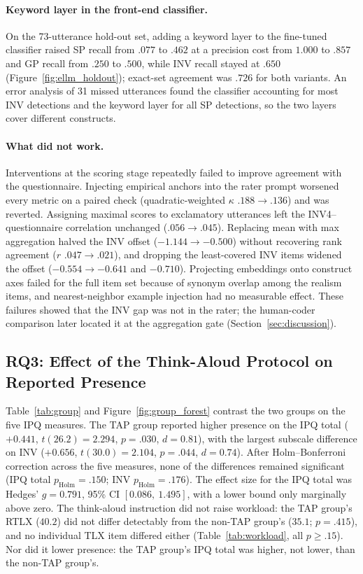 \paragraph{Keyword layer in the front-end classifier.}
On the 73-utterance hold-out set, adding a keyword layer to the fine-tuned classifier raised SP recall from $.077$ to $.462$ at a precision cost from $1.000$ to $.857$ and GP recall from $.250$ to $.500$, while INV recall stayed at $.650$ (Figure~\ref{fig:ellm_holdout}); exact-set agreement was $.726$ for both variants. An error analysis of 31 missed utterances found the classifier accounting for most INV detections and the keyword layer for all SP detections, so the two layers cover different constructs.

\paragraph{What did not work.}
Interventions at the scoring stage repeatedly failed to improve agreement with the questionnaire. Injecting empirical anchors into the rater prompt worsened every metric on a paired check (quadratic-weighted $\kappa$ $.188\rightarrow.136$) and was reverted. Assigning maximal scores to exclamatory utterances left the INV4--questionnaire correlation unchanged ($.056\rightarrow.045$). Replacing mean with max aggregation halved the INV offset ($-1.144\rightarrow-0.500$) without recovering rank agreement ($r$ $.047\rightarrow.021$), and dropping the least-covered INV items widened the offset ($-0.554\rightarrow-0.641$ and $-0.710$). Projecting embeddings onto construct axes failed for the full item set because of synonym overlap among the realism items, and nearest-neighbor example injection had no measurable effect. These failures showed that the INV gap was not in the rater; the human-coder comparison later located it at the aggregation gate (Section~\ref{sec:discussion}).


\subsection{RQ3: Effect of the Think-Aloud Protocol on Reported Presence}
\label{subsec:rq3}

Table~\ref{tab:group} and Figure~\ref{fig:group_forest} contrast the two groups on the five IPQ measures. The TAP group reported higher presence on the IPQ total ($+0.441$, $t(26.2)=2.294$, $p=.030$, $d=0.81$), with the largest subscale difference on INV ($+0.656$, $t(30.0)=2.104$, $p=.044$, $d=0.74$). After Holm--Bonferroni correction across the five measures, none of the differences remained significant (IPQ total $p_{\mathrm{Holm}}=.150$; INV $p_{\mathrm{Holm}}=.176$). The effect size for the IPQ total was Hedges' $g=0.791$, 95\% CI $[0.086,\ 1.495]$, with a lower bound only marginally above zero. The think-aloud instruction did not raise workload: the TAP group's RTLX ($40.2$) did not differ detectably from the non-TAP group's ($35.1$; $p=.415$), and no individual TLX item differed either (Table~\ref{tab:workload}, all $p \geq .15$). Nor did it lower presence: the TAP group's IPQ total was higher, not lower, than the non-TAP group's.

